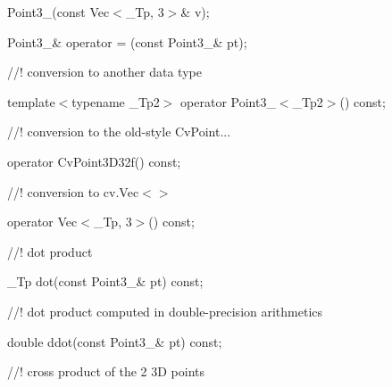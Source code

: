{\ttfamily }

{\ttfamily }

{\ttfamily Point3\+\_\+(const Vec$<$\+\_\+\+Tp, 3$>$\& v);}

{\ttfamily }

{\ttfamily }

{\ttfamily Point3\+\_\+\& operator = (const Point3\+\_\+\& pt);}

{\ttfamily }

{\ttfamily }

{\ttfamily //! conversion to another data type}

{\ttfamily }

{\ttfamily }

{\ttfamily template$<$typename \+\_\+\+Tp2$>$ operator Point3\+\_\+$<$\+\_\+\+Tp2$>$() const;}

{\ttfamily }

{\ttfamily }

{\ttfamily //! conversion to the old-\/style Cv\+Point...}

{\ttfamily }

{\ttfamily }

{\ttfamily operator Cv\+Point3\+D32f() const;}

{\ttfamily }

{\ttfamily }

{\ttfamily //! conversion to cv.\+Vec$<$$>$}

{\ttfamily }

{\ttfamily }

{\ttfamily operator Vec$<$\+\_\+\+Tp, 3$>$() const;}

{\ttfamily }

{\ttfamily }

{\ttfamily //! dot product}

{\ttfamily }

{\ttfamily }

{\ttfamily \+\_\+\+Tp dot(const Point3\+\_\+\& pt) const;}

{\ttfamily }

{\ttfamily }

{\ttfamily //! dot product computed in double-\/precision arithmetics}

{\ttfamily }

{\ttfamily }

{\ttfamily double ddot(const Point3\+\_\+\& pt) const;}

{\ttfamily }

{\ttfamily }

{\ttfamily //! cross product of the 2 3D points}

